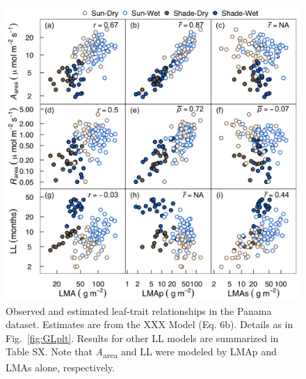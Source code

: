 \documentclass[
  12pt,
  a4paper,
,tablecaptionabove
]{scrartcl}
\providecommand{\DIFaddbeginFL}{} %
\providecommand{\DIFaddendFL}{} %
\providecommand{\DIFdelbeginFL}{} %
\providecommand{\DIFdelendFL}{} %
\newcommand{\DIFscaledelfig}{0.5}
\newlength{\DIFdelgraphicswidth} %
\newlength{\DIFdelgraphicsheight} %
\newcommand{\DIFaddincludegraphics}[2][]{{\color{blue}\fbox{\DIFOincludegraphics[#1]{#2}}}} %
\newcommand{\DIFdelincludegraphics}[2][]{%
\sbox{\DIFdelgraphicsbox}{\DIFOincludegraphics[#1]{#2}}%
\settoboxwidth{\DIFdelgraphicswidth}{\DIFdelgraphicsbox} %
\settoboxtotalheight{\DIFdelgraphicsheight}{\DIFdelgraphicsbox} %
\scalebox{\DIFscaledelfig}{%
\parbox[b]{\DIFdelgraphicswidth}{\usebox{\DIFdelgraphicsbox}\\[-\baselineskip] \rule{\DIFdelgraphicswidth}{0em}}\llap{\resizebox{\DIFdelgraphicswidth}{\DIFdelgraphicsheight}{%
\setlength{\unitlength}{\DIFdelgraphicswidth}%
\begin{picture}(1,1)%
\thicklines\linethickness{2pt} %
{\color[rgb]{1,0,0}\put(0,0){\framebox(1,1){}}}%
{\color[rgb]{1,0,0}\put(0,0){\line( 1,1){1}}}%
{\color[rgb]{1,0,0}\put(0,1){\line(1,-1){1}}}%
\end{picture}%
}\hspace*{3pt}}} %
} %
\DeclareRobustCommand{\DIFaddbeginFL}{\DIFOaddbeginFL \let\includegraphics\DIFaddincludegraphics} %
\DeclareRobustCommand{\DIFaddendFL}{\DIFOaddendFL \let\includegraphics\DIFOincludegraphics} %
\DeclareRobustCommand{\DIFdelbeginFL}{\DIFOdelbeginFL \let\includegraphics\DIFdelincludegraphics} %
\DeclareRobustCommand{\DIFdelendFL}{\DIFOaddendFL \let\includegraphics\DIFOincludegraphics} %
\begin{document}
\newpage

\begin{figure}
\DIFdelbeginFL %
\DIFdelendFL \DIFaddbeginFL \hypertarget{fig:PAplt}{%
\centering
\includegraphics{../figs/PA_scatter.png}
\caption{Observed and estimated leaf-trait relationships in the Panama dataset.
Estimates are from the XXX Model (Eq. 6b).
Details as in Fig.~\ref{fig:GLplt}.
Results for other LL models are summarized in Table SX.
Note that \emph{A}\textsubscript{area} and LL were modeled by LMAp and LMAs alone, respectively.}\label{fig:PAplt}
}
\DIFaddendFL \end{figure}

\newpage
\end{document}
